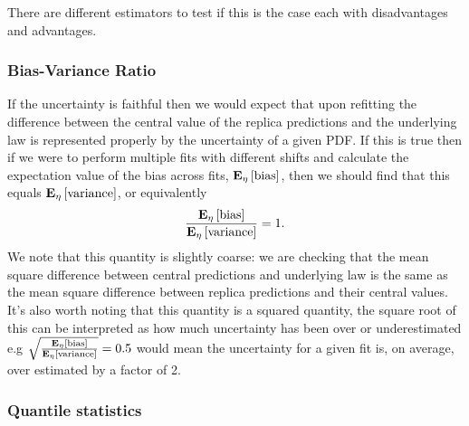 There are different estimators to test if this
is the case each with disadvantages and advantages.

\subsubsection{Bias-Variance Ratio}

If the uncertainty is faithful then we would expect that upon refitting the
difference between the central value of the replica predictions and the underlying
law is represented properly by the uncertainty of a given PDF. If this is true
then if we were to perform multiple fits with different shifts and calculate the
expectation value of the bias across fits, $\mathbf{E}_{\eta}\left[ {\rm bias} \right]$, then we should find
that this equals $\mathbf{E}_{\eta}\left[ {\rm variance} \right]$, or equivalently
\begin{equation}
    \frac{\mathbf{E}_{\eta}\left[ {\rm bias} \right]}{\mathbf{E}_{\eta}\left[ {\rm variance} \right]} = 1.
\end{equation}
We note that this quantity is slightly coarse: we are checking that the mean square
difference between central predictions and underlying law is the same as the
mean square difference between replica predictions and their central values.
It's also worth noting that this quantity is a squared quantity, the square
root of this can be interpreted as how much uncertainty has been over or
underestimated e.g $\sqrt{\frac{\mathbf{E}_{\eta}\left[ {\rm bias} \right]}{\mathbf{E}_{\eta}\left[ {\rm variance} \right]}} = 0.5$ would
mean the uncertainty for a given fit is, on average, over estimated by a factor
of 2.

\subsubsection{Quantile statistics}

